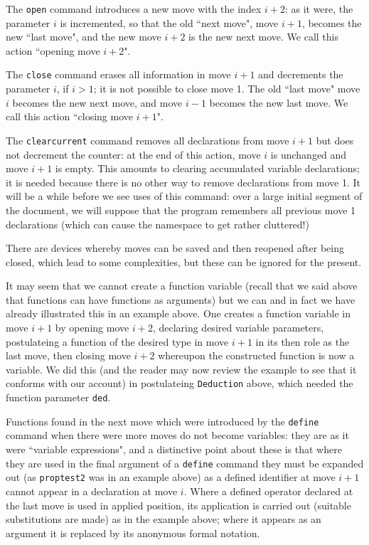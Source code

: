 \documentclass[12pt]{article}
\begin{document}
The {\tt open} command introduces a new move with the index $i+2$:  as it were, the parameter $i$ is incremented, so that the old ``next move", move $i+1$,
becomes the new ``last move", and the new move $i+2$ is the new next move.  We call this action ``opening move $i+2$".

The {\tt close} command erases all information in move $i+1$ and decrements the parameter $i$, if $i>1$;  it is not possible to close move 1.
The old ``last move" move $i$ becomes the new next move, and move $i-1$ becomes the new last move.  We call this action ``closing move $i+1$".

The {\tt clearcurrent} command removes all declarations from move $i+1$ but does not decrement the counter:  at the end of this action,
move $i$ is unchanged and move $i+1$ is empty.  This amounts to clearing accumulated variable declarations;  it is needed because there is no other way
to remove declarations from move 1.  It will be a while before we see uses of this command:  over a large initial segment of the document, we will suppose that the program remembers all previous move 1 declarations (which can cause the namespace to get rather cluttered!)

There are devices whereby moves can be saved and then reopened after being closed, which lead to some complexities, but these can be ignored for the present.

It may seem that we cannot create a function variable (recall that we said above that functions can have functions as arguments) but we can and in fact we have already illustrated this in an example above.  One creates a function variable in move $i+1$ by opening move $i+2$, declaring desired variable parameters, postulateing a function of the desired type in move $i+1$ in its then role as the last move, then closing move $i+2$ whereupon the constructed function is now a variable.   We did this (and the reader may now review the example to see that it conforms with our account) in postulateing {\tt Deduction} above, which needed the function parameter {\tt ded}.

Functions found in the next move which were  introduced by the {\tt define} command when there were more moves do not become variables:  they are as it were ``variable expressions", and a distinctive point about these is that where they are used in the final argument of a {\tt define} command they must be expanded out (as {\tt proptest2} was in an example above)
as a defined identifier at move $i+1$ cannot appear in a declaration at move $i$.  Where a defined operator declared at the last move is used in applied position, its application is carried out (suitable substitutions are made) as in the example above;  where it appears as an argument it is replaced by its anonymous formal notation.
\end{document}
